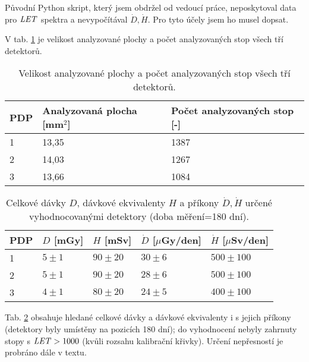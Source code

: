 
Původní Python skript, který jsem obdržel od vedoucí práce, neposkytoval data pro $\mathit{LET}$ spektra a nevypočítával $\dot{D},\dot{H}$. Pro tyto účely jsem ho musel dopsat. 
 
V tab. \ref{tab:praktickaCast_analyzovanaPlocha} je velikost analyzované plochy a počet analyzovaných stop všech tří detektorů.
\begin{table}[H]
  \centering
  \caption{Velikost analyzované plochy a počet analyzovaných stop všech tří detektorů.}
  \label{tab:praktickaCast_analyzovanaPlocha}
  \begin{tabular}{lll}
	\toprule
	PDP&Analyzovaná plocha [mm$^2$]& Počet analyzovaných stop [-]\\
	\midrule
	1&13,35&1387\\
	2&14,03&1267\\
	3&13,66&1084\\
	\bottomrule
  \end{tabular}
\end{table}
\begin{table}[h]
  \centering
  \caption{Celkové dávky $D$, dávkové ekvivalenty $H$ a příkony $\dot{D},\dot{H}$ určené vyhodnocovanými detektory (doba měření=180 dní).}
  \label{tab:praktickaCast_davkyVysledky}
  \begin{tabular}{lllll}
	\toprule
	PDP&$D$ [mGy]&$H$ [mSv]&$\dot{D}$ [$\mu$Gy/den]&$\dot{H}$ [$\mu$Sv/den]\\
	\midrule
	1&$5\pm1$&$90\pm20$&$30\pm6$&$500\pm100$\\
	2&$5\pm1$&$90\pm20$&$28\pm6$&$500\pm100$\\
	3&$4\pm1$&$80\pm20$&$24\pm5$&$400\pm100$\\
	\bottomrule
  \end{tabular}
\end{table}

Tab. \ref{tab:praktickaCast_davkyVysledky} obsahuje hledané celkové dávky a dávkové ekvivalenty i s jejich příkony (detektory byly umístěny na pozicích 180 dní); do vyhodnocení nebyly zahrnuty stopy s $\mathit{LET}>1000$ (kvůli rozsahu kalibrační křivky). Určení nepřesností je probráno dále v textu.

